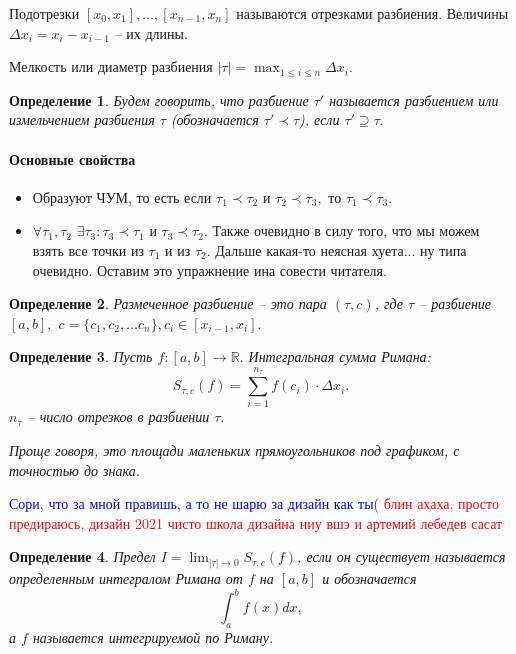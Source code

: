 \documentclass{article}
\theoremstyle{plain}
\newtheorem{definition}{Определение}
\theoremstyle{definition}
\theoremstyle{remark}
\renewcommand{\*}{\cdot}
\begin{document}
Подотрезки $[x_0, x_1],\ldots, [x_{n-1}, x_n]$ называются отрезками разбиения. Величины $\Delta x_i = x_i - x_{i-1}$ -- их длины.

Мелкость или диаметр разбиения $ |\tau| = \max_{1\leq i \leq n}\Delta x_{i}.$

\begin{definition}
Будем говорить, что разбиение $\tau'$ называется разбиением или измельчением разбиения $\tau$ (обозначается $\tau' \prec \tau$), если $\tau' \supseteq \tau.$
\end{definition}

\paragraph{Основные свойства}
\begin{itemize}
    \item Образуют ЧУМ, то есть если $\tau_1 \prec \tau_2$ и $\tau_2 \prec \tau_3,$ то $\tau_1 \prec \tau_3$.
    \item $\forall \tau_1, \tau_2$ $\exists \tau_3: \tau_3 \prec \tau_1$ и $\tau_3 \prec \tau_2$. Также очевидно в силу того, что мы можем взять все точки из $\tau_1$ и из $\tau_2$. Дальше какая-то неясная хуета... ну типа очевидно. Оставим это упражнение ина совести читателя.
\end{itemize}

\begin{definition}
Размеченное разбиение -- это пара $(\tau, c)$, где $\tau$ -- разбиение $[a, b],$ $c = \{c_1, c_2, ... c_n\}, c_i \in [x_{i-1}, x_i].$
\end{definition}



\begin{definition}
Пусть $f : [a, b] \rightarrow \mathbb{R}.$ Интегральная сумма Римана: \[S_{\tau, c}(f) = \sum_{i = 1}^{n_{\tau}} f(c_i) \cdot \Delta x_i.\]
$n_{\tau}$ -- число отрезков в разбиении $\tau.$

Проще говоря, это площади маленьких прямоугольников под графиком, с точностью до знака.
\end{definition}
\textcolor{blue}{Сори, что за мной правишь, а то не шарю за дизайн как ты(}
\textcolor{red}{блин ахаха, просто предираюсь, дизайн 2021 чисто школа дизайна ниу вшэ и артемий лебедев сасат}
\begin{definition}
Предел $I = \lim_{|\tau| \rightarrow 0}S_{\tau, c}(f)$, если он существует называется определенным интегралом Римана от $f$ на $[a, b]$ и обозначается
$$\int_a^bf(x)dx,$$
а $f$ называется интегрируемой по Риману.
\end{definition}
\end{document}
